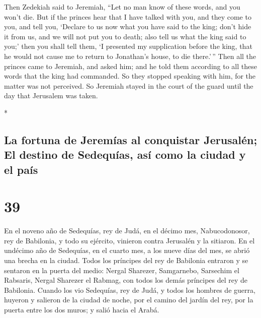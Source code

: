 \begin{paracol}{2}
\begin{otherlanguage}{english}
 Then Zedekiah said to Jeremiah, ``Let no man know of
these words, and you won't die.  But if the princes hear
that I have talked with you, and they come to you, and tell you,
`Declare to us now what you have said to the king; don't hide it from
us, and we will not put you to death; also tell us what the king said to
you;'  then you shall tell them, `I presented my
supplication before the king, that he would not cause me to return to
Jonathan's house, to die there.'\,''  Then all the
princes came to Jeremiah, and asked him; and he told them according to
all these words that the king had commanded. So they stopped speaking
with him, for the matter was not perceived.  So Jeremiah
stayed in the court of the guard until the day that Jerusalem was taken.

\end{otherlanguage}

\switchcolumn[0]*

\hypertarget{la-fortuna-de-jeremuxedas-al-conquistar-jerusaluxe9n-el-destino-de-sedequuxedas-asuxed-como-la-ciudad-y-el-pauxeds}{%
\subsection{La fortuna de Jeremías al conquistar Jerusalén; El destino
de Sedequías, así como la ciudad y el
país}\label{la-fortuna-de-jeremuxedas-al-conquistar-jerusaluxe9n-el-destino-de-sedequuxedas-asuxed-como-la-ciudad-y-el-pauxeds}}

\hypertarget{section-76}{%
\section{39}\label{section-76}}

 En el noveno año de Sedequías, rey de Judá, en el décimo
mes, Nabucodonosor, rey de Babilonia, y todo su ejército, vinieron
contra Jerusalén y la sitiaron.  En el undécimo año de
Sedequías, en el cuarto mes, a los nueve días del mes, se abrió una
brecha en la ciudad.  Todos los príncipes del rey de
Babilonia entraron y se sentaron en la puerta del medio: Nergal
Sharezer, Samgarnebo, Sarsechim el Rabsaris, Nergal Sharezer el Rabmag,
con todos los demás príncipes del rey de Babilonia. 
Cuando los vio Sedequías, rey de Judá, y todos los hombres de guerra,
huyeron y salieron de la ciudad de noche, por el camino del jardín del
rey, por la puerta entre los dos muros; y salió hacia el Arabá.


\end{paracol}
